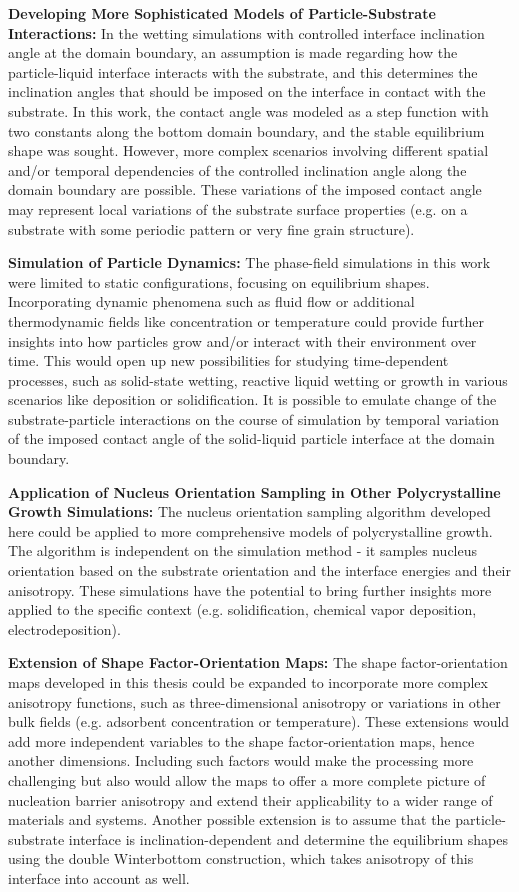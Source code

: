 \textbf{Developing More Sophisticated Models of Particle-Substrate Interactions:} In the wetting simulations with controlled interface inclination angle at the domain boundary, an assumption is made regarding how the particle-liquid interface interacts with the substrate, and this determines the inclination angles that should be imposed on the interface in contact with the substrate. In this work, the contact angle was modeled as a step function with two constants along the bottom domain boundary, and the stable equilibrium shape was sought. However, more complex scenarios involving different spatial and/or temporal dependencies of the controlled inclination angle along the domain boundary are possible. These variations of the imposed contact angle may represent local variations of the substrate surface properties (e.g. on a substrate with some periodic pattern or very fine grain structure). 

\textbf{Simulation of Particle Dynamics:} The phase-field simulations in this work were limited to static configurations, focusing on equilibrium shapes. Incorporating dynamic phenomena such as fluid flow or additional thermodynamic fields like concentration or temperature could provide further insights into how particles grow and/or interact with their environment over time. This would open up new possibilities for studying time-dependent processes, such as solid-state wetting, reactive liquid wetting or growth in various scenarios like deposition or solidification. It is possible to emulate change of the substrate-particle interactions on the course of simulation by temporal variation of the imposed contact angle of the solid-liquid particle interface at the domain boundary. 
	
\textbf{Application of Nucleus Orientation Sampling in Other Polycrystalline Growth Simulations:} The nucleus orientation sampling algorithm developed here could be applied to more comprehensive models of polycrystalline growth. The algorithm is independent on the simulation method - it samples nucleus orientation based on the substrate orientation and the interface energies and their anisotropy. These simulations have the potential to bring further insights more applied to the specific context (e.g. solidification, chemical vapor deposition, electrodeposition).

\textbf{Extension of Shape Factor-Orientation Maps:} The shape factor-orientation maps developed in this thesis could be expanded to incorporate more complex anisotropy functions, such as three-dimensional anisotropy or variations in other bulk fields (e.g. adsorbent concentration or temperature). These extensions would add more independent variables to the shape factor-orientation maps, hence another dimensions. Including such factors would make the processing more challenging but also would allow the maps to offer a more complete picture of nucleation barrier anisotropy and extend their applicability to a wider range of materials and systems. Another possible extension is to assume that the particle-substrate interface is inclination-dependent and determine the equilibrium shapes using the double Winterbottom construction, which takes anisotropy of this interface into account as well. 



\cleardoublepage

